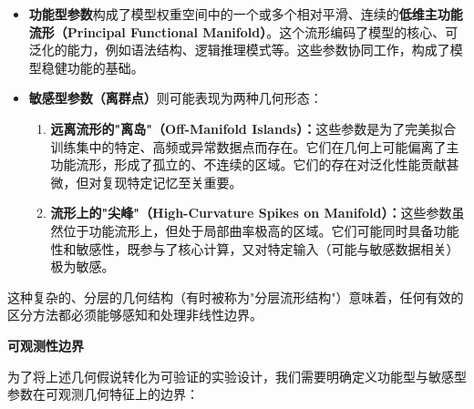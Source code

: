\documentclass[letterpaper,twocolumn,10pt]{article}
\begin{document}
\begin{itemize}
\item \textbf{功能型参数}构成了模型权重空间中的一个或多个相对平滑、连续的\textbf{低维主功能流形（Principal Functional Manifold）}。这个流形编码了模型的核心、可泛化的能力，例如语法结构、逻辑推理模式等。这些参数协同工作，构成了模型稳健功能的基础。

\item \textbf{敏感型参数（离群点）}则可能表现为两种几何形态：
\begin{enumerate}
\item \textbf{远离流形的"离岛"（Off-Manifold Islands）：}这些参数是为了完美拟合训练集中的特定、高频或异常数据点而存在。它们在几何上可能偏离了主功能流形，形成了孤立的、不连续的区域。它们的存在对泛化性能贡献甚微，但对复现特定记忆至关重要。

\item \textbf{流形上的"尖峰"（High-Curvature Spikes on Manifold）：}这些参数虽然位于功能流形上，但处于局部曲率极高的区域。它们可能同时具备功能性和敏感性，既参与了核心计算，又对特定输入（可能与敏感数据相关）极为敏感。
\end{enumerate}
\end{itemize}

这种复杂的、分层的几何结构（有时被称为"分层流形结构"）意味着，任何有效的区分方法都必须能够感知和处理非线性边界。

\textbf{可观测性边界}

为了将上述几何假说转化为可验证的实验设计，我们需要明确定义功能型与敏感型参数在可观测几何特征上的边界：
\end{document}
